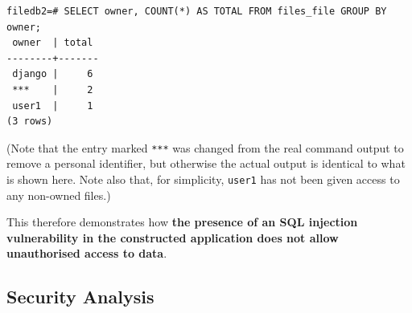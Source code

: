 \documentclass{article}
\begin{document}
\begin{verbatim}
filedb2=# SELECT owner, COUNT(*) AS TOTAL FROM files_file GROUP BY owner;
 owner  | total
--------+-------
 django |     6
 ***    |     2
 user1  |     1
(3 rows)
\end{verbatim}

(Note that the entry marked \verb+***+ was changed from the real command output to remove a personal identifier, but otherwise the actual output is identical to what is shown here. Note also that, for simplicity, \texttt{user1} has not been given access to any non-owned files.)

This therefore demonstrates how \textbf{the presence of an SQL injection vulnerability in the constructed application does not allow unauthorised access to data}.

\subsection{Security Analysis}
\end{document}
